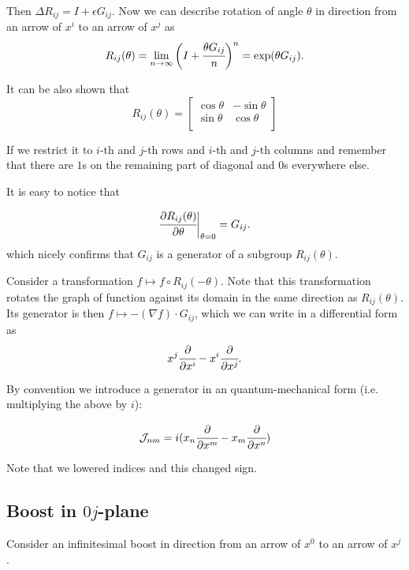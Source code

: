 \documentclass[main.tex]{subfiles}
\begin{document}
Then $\Delta R_{ij} = I + \epsilon G_{ij}$. 
Now we can describe rotation of angle $\theta$ in direction from an arrow of $x^i$ to an arrow of $x^j$ as
\begin{equation}
R_{ij}(\theta) = \lim_{n \to \infty} \bigg(I + \cfrac{\theta G_{ij}}{n}\bigg)^n = \exp(\theta G_{ij}).
\end{equation}


It can be also shown that
\begin{equation}
R_{ij}(\theta) =
\begin{bmatrix}
\cos\theta & -\sin\theta \\
\sin\theta & \cos\theta \\
\end{bmatrix} 
\end{equation}

If we restrict it to $i$-th and $j$-th rows and $i$-th and $j$-th columns and remember that there are $1$s on the remaining part of diagonal and $0$s everywhere else.

It is easy to notice that

\begin{equation}
\cfrac{\partial R_{ij}(\theta)}{\partial \theta}\bigg|_{\theta=0} = G_{ij}.
\end{equation}
which nicely confirms that $G_{ij}$ is a generator of a subgroup $R_{ij}(\theta)$.

Consider a transformation $f \mapsto f\circ R_{ij}(-\theta)$. Note that this transformation rotates the graph of function against its domain in the same direction as $R_{ij}(\theta)$. 
Its generator is then $f \mapsto -(\nabla f) \cdot G_{ij}$, which we can write in a differential form as
\begin{equation}
x^j\cfrac{\partial }{\partial x^i} - x^i\cfrac{\partial }{\partial x^j} . 
\end{equation}

By convention we introduce a generator in an quantum-mechanical form (i.e. multiplying the above by $i$):

\begin{equation}
\mathcal{J}_{nm} = i(x_n\cfrac{\partial }{\partial x^m} - x_m\cfrac{\partial }{\partial x^n})
\end{equation}

Note that we lowered indices and this changed sign. 

\subsection{Boost in $0j$-plane}
Consider an infinitesimal boost in direction from an arrow of $x^0$ to an arrow of $x^j$. 
\end{document}
